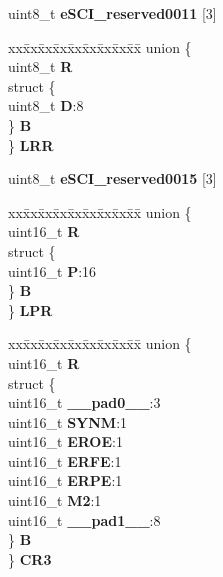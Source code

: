\begin{DoxyCompactItemize}
\begin{tabbing}
\end{tabbing}\item 
\mbox{\label{structESCI__tag_ac5a5e2c8838124b6a1e6c0cdac218352}} 
uint8\+\_\+t {\bfseries e\+S\+C\+I\+\_\+reserved0011} \mbox{[}3\mbox{]}
\item 
\mbox{\label{structESCI__tag_aaf5af7c9e1840dc5abe56f6798a6a034}} 
\begin{tabbing}
xx\=xx\=xx\=xx\=xx\=xx\=xx\=xx\=xx\=\kill
union \{\\
\>uint8\_t {\bfseries R}\\
\>struct \{\\
\>\>uint8\_t {\bfseries D}:8\\
\>\} {\bfseries B}\\
\} {\bfseries LRR}\\

\end{tabbing}\item 
\mbox{\label{structESCI__tag_a3e54a1b554f4ffd2da186a0a7a5d398a}} 
uint8\+\_\+t {\bfseries e\+S\+C\+I\+\_\+reserved0015} \mbox{[}3\mbox{]}
\item 
\mbox{\label{structESCI__tag_a308f18c8041124232b09c0ffc5d9ebfe}} 
\begin{tabbing}
xx\=xx\=xx\=xx\=xx\=xx\=xx\=xx\=xx\=\kill
union \{\\
\>uint16\_t {\bfseries R}\\
\>struct \{\\
\>\>uint16\_t {\bfseries P}:16\\
\>\} {\bfseries B}\\
\} {\bfseries LPR}\\

\end{tabbing}\item 
\mbox{\label{structESCI__tag_acb2697b82c0ef58b82784847194ad3e7}} 
\begin{tabbing}
xx\=xx\=xx\=xx\=xx\=xx\=xx\=xx\=xx\=\kill
union \{\\
\>uint16\_t {\bfseries R}\\
\>struct \{\\
\>\>uint16\_t {\bfseries \_\_pad0\_\_}:3\\
\>\>uint16\_t {\bfseries SYNM}:1\\
\>\>uint16\_t {\bfseries EROE}:1\\
\>\>uint16\_t {\bfseries ERFE}:1\\
\>\>uint16\_t {\bfseries ERPE}:1\\
\>\>uint16\_t {\bfseries M2}:1\\
\>\>uint16\_t {\bfseries \_\_pad1\_\_}:8\\
\>\} {\bfseries B}\\
\} {\bfseries CR3}\\


\end{tabbing}
\end{DoxyCompactItemize}
